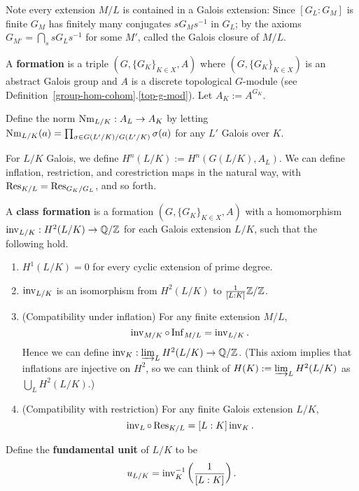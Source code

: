 Note every extension $M/L$ is contained in a Galois extension: Since $[G_L:G_M]$ is finite $G_M$ has finitely many conjugates $sG_Ms^{-1}$ in $G_L$; by the axioms $G_{M'}=\bigcap_s sG_Ls^{-1}$ for some $M'$, called the Galois closure of $M/L$.
\begin{df}
A \textbf{formation} is a triple $(G, \{G_K\}_{K\in X}, A)$ where $(G, \{G_K\}_{K\in X})$ is an abstract Galois group and $A$ is a discrete topological $G$-module (see Definition~\ref{group-hom-cohom}.\ref{top-g-mod}). Let $A_K:=A^{G_K}$.

Define the norm $\operatorname{Nm}_{L/K}:A_L\to A_K$ by letting $\operatorname{Nm}_{L/K}(a)=\prod_{\sigma\in G(L'/K)/G(L'/K)} \sigma(a)$ for any $L'$ Galois over $K$.
\end{df}
For $L/K$ Galois, we define $H^n(L/K):=H^n(G(L/K),A_L)$. We can define inflation, restriction, and corestriction maps in the natural way, with $\operatorname{Res}_{K/L}=\operatorname{Res}_{G_K/G_L}$, and so forth.
\begin{df}
A \textbf{class formation} is a formation $(G, \{G_K\}_{K\in X}, A)$ with a homomorphism $\operatorname{inv}_{L/K}:H^2(L/K)\to \mathbb{Q}/\mathbb{Z}$ for each Galois extension $L/K$, such that the following hold.
\begin{enumerate}
\item
$H^1(L/K)=0$ for every cyclic extension of prime degree.
\item
$\operatorname{inv}_{L/K}$ %
is an isomorphism from $H^2(L/K)$ to $\frac{1}{[L:K]}\mathbb{Z}/\mathbb{Z}$. 
\item (Compatibility under inflation) For any finite extension $M/L$, 
\[\operatorname{inv}_{M/K}\circ \operatorname{Inf}_{M/L}=\operatorname{inv}_{L/K}.\]
Hence we can define $\operatorname{inv}_K:\varinjlim_L H^2(L/K)\to \mathbb{Q}/\mathbb{Z}$. (This axiom implies that inflations are injective on $H^2$, so we can think of  $H(K):=\varinjlim_L H^2(L/K)$ as $\bigcup_L H^2(L/K)$.)
\item (Compatibility with restriction) For any finite Galois extension $L/K$,
\[
\operatorname{inv}_L\circ \operatorname{Res}_{K/L}=[L:K]\operatorname{inv}_K.
\]
\end{enumerate}
Define the \textbf{fundamental unit} of $L/K$ to be
\[
u_{L/K}=\operatorname{inv}_K^{-1}\left( {\frac{1}{[L:K]}} \right).
\]
\end{df}


